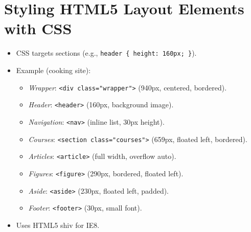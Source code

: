 \documentclass[a4paper,11pt]{article}
\begin{document}
\section{Styling HTML5 Layout Elements with CSS}
\begin{itemize}
    \item CSS targets sections (e.g., \texttt{header \{ height: 160px; \}}).
    \item Example (cooking site):
    \begin{itemize}
        \item \emph{Wrapper}: \texttt{<div class="wrapper">} (940px, centered, bordered).
        \item \emph{Header}: \texttt{<header>} (160px, background image).
        \item \emph{Navigation}: \texttt{<nav>} (inline list, 30px height).
        \item \emph{Courses}: \texttt{<section class="courses">} (659px, floated left, bordered).
        \item \emph{Articles}: \texttt{<article>} (full width, overflow auto).
        \item \emph{Figures}: \texttt{<figure>} (290px, bordered, floated left).
        \item \emph{Aside}: \texttt{<aside>} (230px, floated left, padded).
        \item \emph{Footer}: \texttt{<footer>} (30px, small font).
    \end{itemize}
    \item Uses HTML5 shiv for IE8.
\end{itemize}

\end{document}
